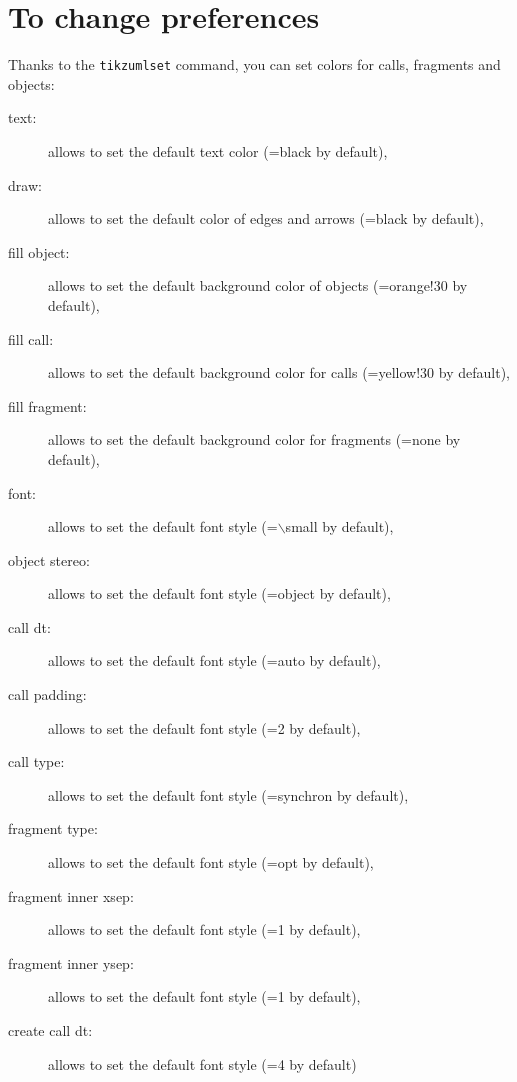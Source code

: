 \documentclass[a4paper,11pt]{report}
\begin{document}
\medskip

\begin{minipage}{0.5\textwidth}
	
\end{minipage}
\begin{minipage}{0.5\textwidth}
	\begin{center}
	\end{center}
\end{minipage}

\section{To change preferences}\label{s.fitseq}

Thanks to the {\tt tikzumlset} command, you can set colors for calls, fragments and objects:

\begin{description}
	\item[text:] allows to set the default text color (=black by default),
	\item[draw:] allows to set the default color of edges and arrows (=black by default),
	\item[fill object:] allows to set the default background color of objects (=orange!30 by default),
	\item[fill call:] allows to set the default background color for calls (=yellow!30 by default),
	\item[fill fragment:] allows to set the default background color for fragments (=none by default),
	\item[font:] allows to set the default font style (=$\backslash$small by default),
	\item[object stereo:] allows to set the default font style (=object by default),
	\item[call dt:] allows to set the default font style (=auto by default),
	\item[call padding:] allows to set the default font style (=2 by default),
	\item[call type:] allows to set the default font style (=synchron by default),
	\item[fragment type:] allows to set the default font style (=opt by default),
	\item[fragment inner xsep:] allows to set the default font style (=1 by default),
	\item[fragment inner ysep:] allows to set the default font style (=1 by default),
	\item[create call dt:] allows to set the default font style (=4 by default)
\end{description}
\end{document}
